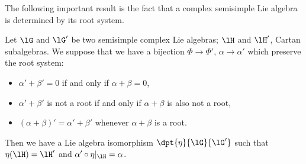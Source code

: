 The following important result is the fact that a complex semisimple Lie algebra is determined by its root system.
\begin{theorem}
Let $\lG$ and $\lG'$ be two semisimple complex Lie algebras; $\lH$ and $\lH'$, Cartan subalgebras. We suppose that we have a bijection $\Phi\to\Phi'$, $\alpha\to\alpha'$ which preserve the root system:

\begin{itemize}
\item $\alpha'+\beta'=0$ if and only if $\alpha+\beta=0$,
\item $\alpha'+\beta'$ is not a root if and only if $\alpha+\beta$ is also not a root,
\item $(\alpha+\beta)'=\alpha'+\beta'$ whenever $\alpha+\beta$ is a root.
\end{itemize}
Then we have a Lie algebra isomorphism $\dpt{\eta}{\lG}{\lG'}$ such that $\eta(\lH)=\lH'$ and $\alpha'\circ\eta|_{\lH}=\alpha$.
\end{theorem}

